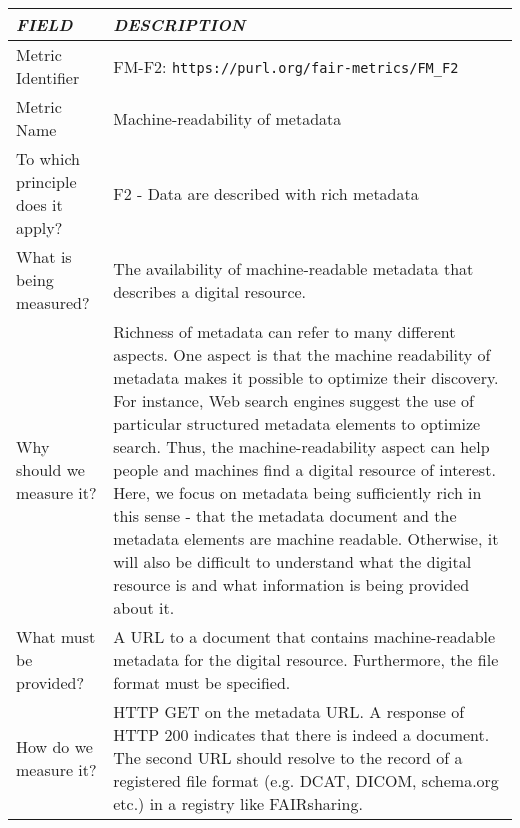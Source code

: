 \documentclass[english]{article}
\begin{document}
\newpage


\centering

\begin{longtable}{|p{5cm}|p{9cm}|}
\hline
\emph{FIELD} & \emph{DESCRIPTION} \\
\hline
Metric Identifier &   FM-F2: \verb"https://purl.org/fair-metrics/FM_F2"
 \\


\hline
Metric Name &   
Machine-readability of metadata

 \\



\hline
To which principle does it apply? &   F2 - Data are described with rich metadata\\



\hline
What is being measured? & 

The availability of machine-readable metadata that describes a digital resource.\\



\hline
Why should we measure it? & 


Richness of metadata can refer to many different aspects. One aspect is that the machine readability of metadata makes it possible to optimize their discovery. For instance, Web search engines suggest the use of particular structured metadata elements to optimize search. Thus, the machine-readability aspect can help people and machines find a digital resource of interest. Here, we focus on metadata being sufficiently rich in this sense - that the metadata document and the metadata elements are machine readable.  Otherwise, it will also be difficult to understand what the digital resource is and what information is being provided about it.

  
\\



\hline
What must be provided? &  

A URL to a document that contains machine-readable metadata for the digital resource. Furthermore, the file format must be specified.

 \\



\hline
How do we measure it? &  
HTTP GET on the metadata URL. A response of HTTP 200 indicates that there is indeed a document. The second URL should resolve to the record of a registered file format (e.g. DCAT, DICOM, schema.org etc.) in a registry like FAIRsharing. \newline
\\




\end{longtable}
\end{document}
